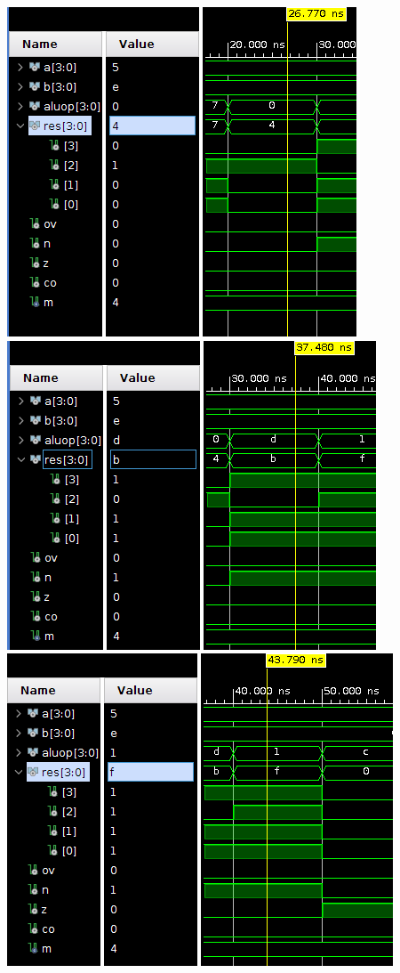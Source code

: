 \documentclass[12pt,executivepaper]{article}
\begin{document}
\begin{center}
    \includegraphics[scale=0.666]{imgs/tres.png}\\
    \includegraphics[scale=0.666]{imgs/cuatro.png}\\
    \includegraphics[scale=0.666]{imgs/cinco.png}\\

\end{center}
\end{document}
